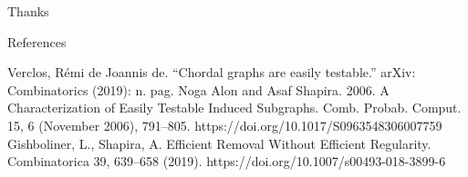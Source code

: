 \documentclass{beamer}
\begin{document}
\begin{frame}
	
\begin{center}
\vspace{3cm}
{\sc \large Thanks} 
\end{center}
\end{frame}



%
%

\begin{frame}{References}
	\begin{thebibliography}{*}
		Verclos, Rémi de Joannis de. “Chordal graphs are easily testable.” arXiv: Combinatorics (2019): n. pag.
		Noga Alon and Asaf Shapira. 2006. A Characterization of Easily Testable Induced Subgraphs. Comb. Probab. Comput. 15, 6 (November 2006), 791–805. https://doi.org/10.1017/S0963548306007759
		Gishboliner, L., Shapira, A. Efficient Removal Without Efficient Regularity. Combinatorica 39, 639–658 (2019). https://doi.org/10.1007/s00493-018-3899-6
	\end{thebibliography}
	
\end{frame}
\end{document}
